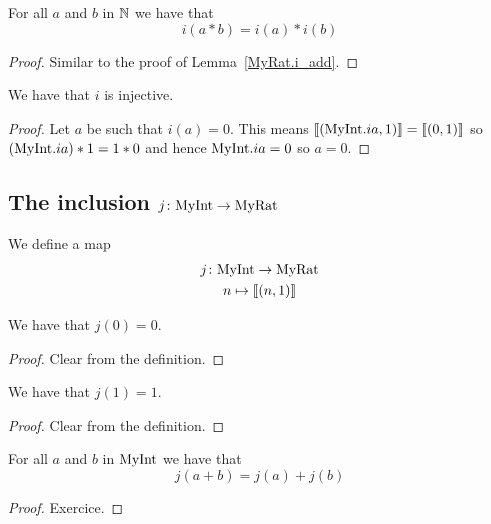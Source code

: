 \begin{lemma}
    \label{MyRat.i_mul}
    \leanok
For all $a$ and $b$ in $\mathbb{N}$ we have that
\[
i(a*b) = i(a) * i(b)
\]
\end{lemma}
\begin{proof}
    \leanok
Similar to the proof of Lemma~\ref{MyRat.i_add}.
\end{proof}

\begin{lemma}
    \label{MyRat.i_injective}
    \leanok
    We have that $i$ is injective.
\end{lemma}
\begin{proof}
    \leanok
    Let $a$ be such that $i(a)=0$. This means $\llbracket (\mathrm{MyInt}.i a,1) \rrbracket = \llbracket (0,1) \rrbracket$ so $(\mathrm{MyInt}.i a) * 1 = 1 * 0$ and hence $\mathrm{MyInt}.i a = 0$ so $a = 0$.
\end{proof}

\subsection{\texorpdfstring{The inclusion $j \colon \mathrm{MyInt} \to \mathrm{MyRat}$}{The inclusion}}
\begin{definition}
    \label{MyRat.j}
    \leanok
    We define a map
\begin{gather*}
    j \colon \mathrm{MyInt} \to \mathrm{MyRat} \\
    n \mapsto \llbracket (n,1) \rrbracket
\end{gather*}
\end{definition}

\begin{lemma}
    \label{MyRat.j_zero}
    \leanok
We have that $j(0) = 0$.
\end{lemma}
\begin{proof}
    \leanok
Clear from the definition.
\end{proof}

\begin{lemma}
    \label{MyRat.j_one}
    \leanok
We have that $j(1) = 1$.
\end{lemma}
\begin{proof}
    \leanok
Clear from the definition.
\end{proof}

\begin{lemma}
    \label{MyRat.j_add}
    \leanok
For all $a$ and $b$ in $\mathrm{MyInt}$ we have that
\[
j(a+b) = j(a) + j(b)
\]
\end{lemma}
\begin{proof}
    \leanok
Exercice.
\end{proof}

